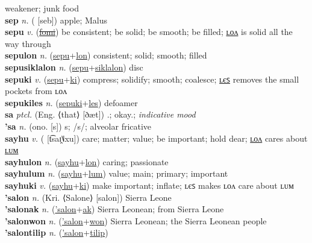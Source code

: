 weakener; junk food \label{setlukiles} \\
\textbf{sep} \textit{n.} ( [seb])
apple; Malus \label{sep} \\
\textbf{sepu} \textit{v.} (\hyperref[fomi]{\sout{fomi}})
be consistent; be solid; be smooth; be filled; \hyperref[sepulon]{ʟᴏᴧ} is solid all the way through \label{sepu} \\
\textbf{sepulon} \textit{n.} (\hyperref[sepu]{sepu}+\hyperref[lon]{lon})
consistent; solid; smooth; filled \label{sepulon} \\
\textbf{sepusiklalon} \textit{n.} (\hyperref[sepu]{sepu}+\hyperref[siklalon]{siklalon})
disc \label{sepusiklalon} \\
\textbf{sepuki} \textit{v.} (\hyperref[sepu]{sepu}+\hyperref[ki]{ki})
compress; solidify; smooth; coalesce; \hyperref[sepukiles]{ʟєꜱ} removes the small pockets from ʟᴏᴧ \label{sepuki} \\
\textbf{sepukiles} \textit{n.} (\hyperref[sepuki]{sepuki}+\hyperref[les]{les})
defoamer \label{sepukiles} \\
\textbf{sa} \textit{ptcl.} (Eng. ⟨that⟩ [ðæt])
.; okay.; \textit{indicative mood} \label{sa} \\
\textbf{'sa} \textit{n.} (ono. [s])
s; /s/; alveolar fricative \label{'sa} \\
\textbf{sayhu} \textit{v.} ( [t͡saɪ̯˥˩xu])
care; matter; value; be important; hold dear; \hyperref[sayhulon]{ʟᴏᴧ} cares about \hyperref[sayhulum]{ʟᴜᴍ} \label{sayhu} \\
\textbf{sayhulon} \textit{n.} (\hyperref[sayhu]{sayhu}+\hyperref[lon]{lon})
caring; passionate \label{sayhulon} \\
\textbf{sayhulum} \textit{n.} (\hyperref[sayhu]{sayhu}+\hyperref[lum]{lum})
value; main; primary; important \label{sayhulum} \\
\textbf{sayhuki} \textit{v.} (\hyperref[sayhu]{sayhu}+\hyperref[ki]{ki})
make important; inflate; ʟєꜱ makes ʟᴏᴧ care about ʟᴜᴍ \label{sayhuki} \\
\textbf{'salon} \textit{n.} (Kri. ⟨Salone⟩ [salon])
Sierra Leone \label{'salon} \\
\textbf{'salonak} \textit{n.} (\hyperref['salon]{'salon}+\hyperref[ak]{ak})
Sierra Leonean; from Sierra Leone \label{'salonak} \\
\textbf{'salonwon} \textit{n.} (\hyperref['salon]{'salon}+\hyperref[won]{won})
Sierra Leonean; the Sierra Leonean people \label{'salonwon} \\
\textbf{'salontilip} \textit{n.} (\hyperref['salon]{'salon}+\hyperref[tilip]{tilip})
